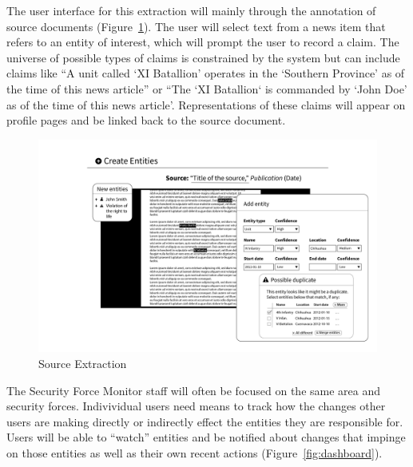 \documentclass[format=siggraph, review=true]{acmart}
\begin{document}
The user interface for this extraction will mainly through the
annotation of source documents (Figure~\ref{fig:new-entities}). The user
will select text from a news item that refers to an entity of
interest, which will prompt the user to record a claim. The universe
of possible types of claims is constrained by the system but can
include claims like ``A unit called `XI Batallion' operates in the
`Southern Province' as of the time of this news article'' or ``The `XI
Batallion` is commanded by `John Doe' as of the time of this news
article'. Representations of these claims will appear on profile pages
and be linked back to the source document.

\begin{figure}[h]
\includegraphics[width=\columnwidth]{images/sketches/new-entities.png}
\caption{Source Extraction}
\label{fig:new-entities}
\end{figure}

The Security Force Monitor staff will often be focused on the same
area and security forces. Indivividual users need means to track how
the changes other users are making directly or indirectly effect the
entities they are responsible for. Users will be able to ``watch''
entities and be notified about changes that impinge on those entities
as well as their own recent actions (Figure~\ref{fig:dashboard}).
\end{document}
